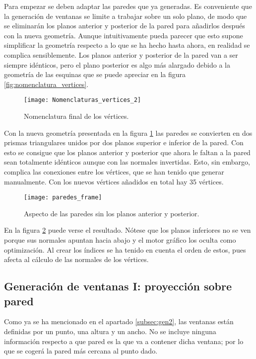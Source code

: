 Para empezar se deben adaptar las paredes que ya generadas. Es conveniente que la generación de ventanas se limite a trabajar sobre un solo plano, de modo que se eliminarán los planos anterior y posterior de la pared para añadirlos después con la nueva geometría. Aunque intuitivamente pueda parecer que esto supone simplificar la geometría respecto a lo que se ha hecho hasta ahora, en realidad se complica sensiblemente. Los planos anterior y posterior de la pared van a ser siempre idénticos, pero el plano posterior es algo más alargado debido a la geometría de las esquinas que se puede apreciar en la figura \ref{fig:nomenclatura_vertices}.

\begin{figure}[H]
    \centering
    \texttt{[image: Nomenclaturas\_vertices\_2]}
    \caption{Nomenclatura final de los vértices.}
    \label{fig:nomenclatura_vertices_2}
\end{figure}

Con la nueva geometría presentada en la figura \ref{fig:nomenclatura_vertices_2} las paredes se convierten en dos prismas triangulares unidos por dos planos superior e inferior de la pared. Con esto se consigue que los planos anterior y posterior que ahora le faltan a la pared sean totalmente idénticos aunque con las normales invertidas. Esto, sin embargo, complica las conexiones entre los vértices, que se han tenido que generar manualmente. Con los nuevos vértices añadidos en total hay 35 vértices.

\begin{figure}[H]
    \centering
    \texttt{[image: paredes\_frame]}
    \caption{Aspecto de las paredes sin los planos anterior y posterior.}
    \label{fig:nueva_estructura}
\end{figure}

En la figura \ref{fig:nueva_estructura} puede verse el resultado. Nótese que los planos inferiores no se ven porque sus normales apuntan hacia abajo y el motor gráfico los oculta como optimización. Al crear los índices se ha tenido en cuenta el orden de estos, pues afecta al cálculo de las normales de los vértices.

\subsection{Generación de ventanas I: proyección sobre pared}
\label{sec:wallgenwindowsi}
Como ya se ha mencionado en el apartado \ref{subsec:gen2}, las ventanas están definidas por un punto, una altura y un ancho. No se incluye ninguna información respecto a que pared es la que va a contener dicha ventana; por lo que se cogerá la pared más cercana al punto dado.

